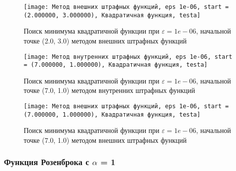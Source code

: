             \begin{figure}[H]
	        \centering
	        \texttt{[image: Метод внешних штрафных функций, eps 1e-06, start = (2.000000, 3.000000), Квадратичная функция, testa]}%
	        \caption{Поиск минимума квадратичной функции при $\varepsilon = 1e-06$, начальной точке (2.0, 3.0) методом внешних штрафных функций}
	        \vspace*{-1.2cm}
            \end{figure}
            
            \begin{figure}[H]
	        \centering
	        \texttt{[image: Метод внутренних штрафных функций, eps 1e-06, start = (7.000000, 1.000000), Квадратичная функция, testa]}%
	        \caption{Поиск минимума квадратичной функции при $\varepsilon = 1e-06$, начальной точке (7.0, 1.0) методом внутренних штрафных функций}
	        \vspace*{-1.2cm}
            \end{figure}
            
            \begin{figure}[H]
	        \centering
	        \texttt{[image: Метод внешних штрафных функций, eps 1e-06, start = (7.000000, 1.000000), Квадратичная функция, testa]}%
	        \caption{Поиск минимума квадратичной функции при $\varepsilon = 1e-06$, начальной точке (7.0, 1.0) методом внешних штрафных функций}
	        \vspace*{-1.2cm}
            \end{figure}
            \subsubsection{Функция Розенброка с $\alpha$ = 1}

